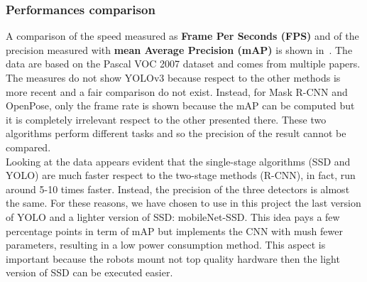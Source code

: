 \subsubsection*{Performances comparison}
A comparison of the speed measured as \textbf{Frame Per Seconds (FPS)} and of the precision measured with \textbf{mean Average Precision (mAP)} is shown in~. The data are based on the Pascal VOC 2007 dataset\cite{pascal-voc-2007} and comes from multiple papers\cite{yolo}\cite{yoloV2}.\\
The measures do not show YOLOv3 because respect to the other methods is more recent and a fair comparison do not exist. Instead, for Mask R-CNN and OpenPose, only the frame rate is shown because the mAP can be computed but it is completely irrelevant respect to the other presented there. These two algorithms perform different tasks and so the precision of the result cannot be compared.\\
Looking at the data appears evident that the single-stage algorithms (SSD and YOLO) are much faster respect to the two-stage methods (R-CNN), in fact, run around 5-10 times faster. Instead, the precision of the three detectors is almost the same. For these reasons, we have chosen to use in this project the last version of YOLO and a lighter version of SSD: mobileNet-SSD. This idea pays a few percentage points in term of mAP but implements the CNN with mush fewer parameters, resulting in a low power consumption method. This aspect is important because the robots mount not top quality hardware then the light version of SSD can be executed easier.

